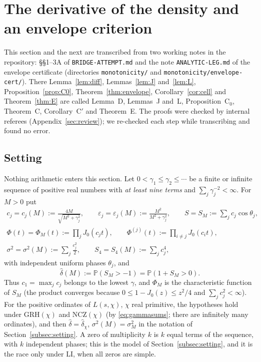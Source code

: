 \documentclass[11pt]{amsart}
\theoremstyle{definition}
\numberwithin{equation}{section}
\newcommand{\eps}{\varepsilon}
\newcommand{\PP}{\mathbb P}
\newcommand{\hd}{\widehat\delta}
\begin{document}
\section{The derivative of the density and an envelope criterion}
\label{sec:envelope}

This section and the next are transcribed from two working notes in
the repository: \S\S1--3A of \texttt{BRIDGE-ATTEMPT.md} and the note
\texttt{ANALYTIC-LEG.md} of the envelope certificate (directories
\texttt{monotonicity/} and \texttt{monotonicity/envelope-cert/}).
There
Lemma~\ref{lem:diff}, Lemmas~\ref{lem:J} and~\ref{lem:L},
Proposition~\ref{prop:C0}, Theorem~\ref{thm:envelope},
Corollary~\ref{cor:cell} and Theorem~\ref{thm:E} are called Lemma~D,
Lemmas~J and~L, Proposition~C$_0$, Theorem~C, Corollary~C$'$ and
Theorem~E. The proofs were checked by internal referees
(Appendix~\ref{sec:review}); we re-checked each step while
transcribing and found no error.

\subsection{Setting}\label{subsec:envsetting}
Nothing arithmetic enters this section. Let
$0<\gamma_1\le\gamma_2\le\cdots$ be a finite or infinite sequence of
positive real numbers with \emph{at least nine terms} and
$\sum_j\gamma_j^{-2}<\infty$. For $M>0$ put
\begin{gather*}
c_j=c_j(M):=\frac{4M}{\sqrt{M^2+\gamma_j^2}},\qquad
\eps_j=\eps_j(M):=\frac{M^2}{M^2+\gamma_j^2},\qquad
S=S_M:=\sum_jc_j\cos\theta_j,\\
\Phi(t)=\Phi_M(t):=\prod_jJ_0(c_jt),\qquad
\Phi^{(j)}(t):=\prod_{i\ne j}J_0(c_it),\\
\sigma^2=\sigma^2(M):=\sum_j\frac{c_j^2}{2},\qquad
S_4=S_4(M):=\sum_jc_j^4,
\end{gather*}
with independent uniform phases $\theta_j$, and
\[
\hd(M):=\PP(S_M>-1)=\PP(1+S_M>0).
\]
Thus $c_1=\max_jc_j$ belongs to the lowest $\gamma$, and
$\Phi_M$ is the characteristic function of $S_M$ (the product
converges because $0\le1-J_0(z)\le z^2/4$ and $\sum_jc_j^2<\infty$).
For the positive ordinates of $L(s,\chi)$, $\chi$ real primitive, the
hypotheses hold under GRH$(\chi)$ and NCZ$(\chi)$ (by
\eqref{eq:gammasums}; there are infinitely many ordinates), and then
$\hd=\hd_\chi$, $\sigma^2(M)=\sigma_M^2$ in the notation of
Section~\ref{subsec:setting}. A zero of multiplicity $k$ is $k$ equal
terms of the sequence, with $k$ independent phases; this is the model
of Section~\ref{subsec:setting}, and it is the race only under LI,
when all zeros are simple.
\end{document}

